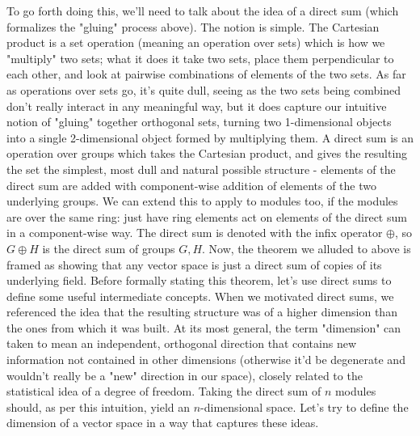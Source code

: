 \documentclass{article}
\newcommand{\nn}{\leavevmode \newline \newline}
\begin{document}
To go forth doing this, we'll need to talk about the idea of a direct sum (which formalizes the "gluing" process above). The notion is simple. The Cartesian product is a set operation (meaning an operation over sets) which is how we "multiply" two sets; what it does it take two sets, place them perpendicular to each other, and look at pairwise combinations of elements of the two sets. As far as operations over sets go, it's quite dull, seeing as the two sets being combined don't really interact in any meaningful way, but it does capture our intuitive notion of "gluing" together orthogonal sets, turning two 1-dimensional objects into a single 2-dimensional object formed by multiplying them. A direct sum is an operation over groups which takes the Cartesian product, and gives the resulting the set the simplest, most dull and natural possible structure - elements of the direct sum are added with component-wise addition of elements of the two underlying groups. We can extend this to apply to modules too, if the modules are over the same ring: just have ring elements act on elements of the direct sum in a component-wise way. The direct sum is denoted with the infix operator $ \oplus $, so $ G \oplus H $ is the direct sum of groups $ G, H $. Now, the theorem we alluded to above is framed as showing that any vector space is just a direct sum of copies of its underlying field.
\nn
Before formally stating this theorem, let's use direct sums to define some useful intermediate concepts. When we motivated direct sums, we referenced the idea that the resulting structure was of a higher dimension than the ones from which it was built. At its most general, the term "dimension" can taken to mean an independent, orthogonal direction that contains new information not contained in other dimensions (otherwise it'd be degenerate and wouldn't really be a "new" direction in our space), closely related to the statistical idea of a degree of freedom. Taking the direct sum of $ n $ modules should, as per this intuition, yield an  $ n $-dimensional space. Let's try to define the dimension of a vector space in a way that captures these ideas.
\nn
\end{document}
